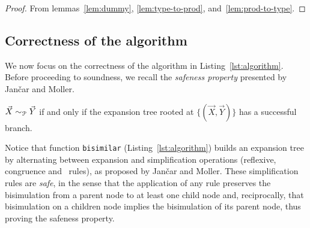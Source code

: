 \begin{proof}
  From lemmas~\ref{lem:dummy}, \ref{lem:type-to-prod}, and~\ref{lem:prod-to-type}.
\end{proof}






\subsection{Correctness of the algorithm}

We now focus on the correctness of the algorithm in
Listing~\ref{lst:algorithm}.  Before proceeding to soundness, we
recall the \emph{safeness property} presented by Jan{\v{c}}ar and
Moller.

\begin{proposition} 
  \label{prop:safeness}
  $\vec X \sim_\mathcal P \vec Y$ if and only if the expansion tree rooted
  at $\{(\vec X, \vec Y)\}$ has a successful branch.
\end{proposition}

Notice that function \lstinline|bisimilar|
(Listing~\ref{lst:algorithm}) builds an expansion tree by alternating
between expansion and simplification operations (reflexive,
congruence and \BPA\ rules), as proposed by Jan{\v{c}}ar and Moller.
%
These simplification rules are \emph{safe}, in the sense that the
application of any rule preserves the bisimulation from a parent node
to at least one child node and, reciprocally, that bisimulation on a
children node implies the bisimulation of its parent node, thus proving
the safeness property.

